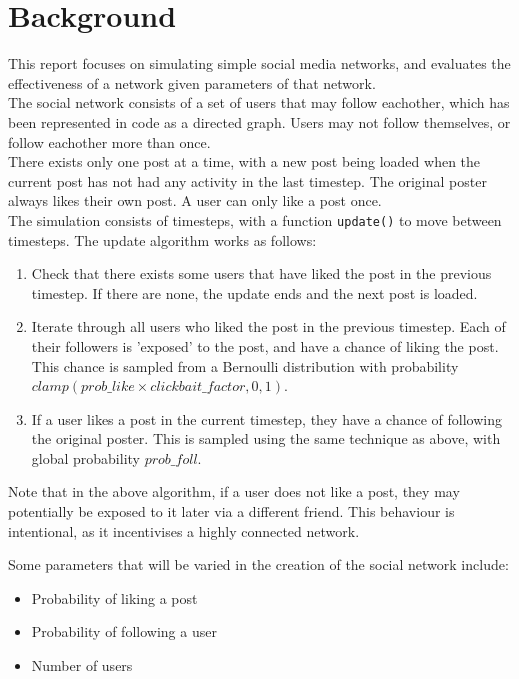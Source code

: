 \documentclass{article}
\begin{document}
\section{Background}
This report focuses on simulating simple social media networks,
and evaluates the effectiveness of a network given parameters
of that network.\\
The social network consists of a set of users that may follow eachother,
which has been represented in code as a directed graph. Users may not follow themselves,
or follow eachother more than once.\\
There exists only one post at a time, with a new post being loaded when the current
post has not had any activity in the last timestep. The original poster always
likes their own post. A user can only like a post once.\\
The simulation consists
of timesteps, with a function \texttt{update()} to move between timesteps.
The update algorithm works as follows:
\begin{enumerate}
    \item Check that there exists some users that have liked the post in the previous timestep.
            If there are none, the update ends and the next post is loaded.
    \item Iterate through all users who liked the post in the previous timestep.
            Each of their followers is 'exposed' to the post, and have a chance of liking the post.
            This chance is sampled from a Bernoulli distribution with probability
            $\mathit{clamp}\left(\mathit{prob\_like} \times \mathit{clickbait\_factor}, 0, 1\right)$.
    \item If a user likes a post in the current timestep, they have a chance of following the
            original poster. This is sampled using the same technique as above, with global probability
            $\mathit{prob\_foll}$.
\end{enumerate}
Note that in the above algorithm, if a user does not like a post, they may potentially
be exposed to it later via a different friend. This behaviour is intentional, as it incentivises
a highly connected network.

Some parameters that will be varied in the creation of the social network include:
\begin{itemize}
    \item Probability of liking a post
    \item Probability of following a user
    \item Number of users
\end{itemize}
\end{document}
